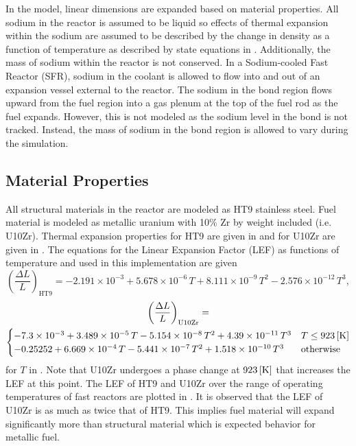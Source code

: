   In the model, linear dimensions are expanded based on material properties.
  All sodium in the reactor is assumed to be liquid so effects of thermal
  expansion within the sodium are assumed to be described by the change in
  density as a function of temperature as described by state equations in
  \cite{sodiumProp}. Additionally, the mass of sodium within the reactor is not
  conserved. In a Sodium-cooled Fast Reactor (SFR), sodium in the coolant is 
  allowed to flow into and out of an expansion vessel external to the reactor.
  The sodium in the bond region flows upward from the fuel region into a gas 
  plenum at the top of the fuel rod as the fuel expands. However, this is not 
  modeled as the sodium level in the bond is not tracked. Instead, the mass of 
  sodium in the bond region is allowed to vary during the simulation.

  \subsection{Material Properties}
    \label{sec:model_details__material_properties}
    All structural materials in the reactor are modeled as HT9 stainless steel.
    Fuel material is modeled as metallic uranium with 10\% Zr by weight included
    (i.e. U10Zr). Thermal expansion properties for HT9 are given in 
    \cite{ht9Prop} and for U10Zr are given in \cite{thexpU10Zr}. The equations 
    for the Linear Expansion Factor (LEF) as functions of temperature and used 
    in this implementation are given
    \begin{equation}
      \label{eq:lef_ht9}
      \left( \frac{\Delta L}{L} \right)_{\text{HT9}} = 
        -2.191 \times 10^{-3} + 5.678 \times 10^{-6} \, T + 
        8.111 \times 10^{-9} \, T^2 - 2.576 \times 10^{-12} \, T^3 ,
    \end{equation}
    \begin{multline}
      \label{eq:lef_u10zr}
      \left( \frac{\Delta L}{L} \right)_{\text{U10Zr}} = \\
        \begin{cases}
          -7.3 \times 10^{-3} + 3.489 \times 10^{-5} \, T 
            - 5.154 \times 10^{-8} \, T^2 + 4.39 \times 10^{-11} \, T^3 & 
            T \le 923 \left[\text{{K}}\right] \\
          -0.25252 + 6.669 \times 10^{-4} \, T - 5.441 \times 10^{-7} \, T^2 
            + 1.518 \times 10^{-10} \, T^3 & \text{otherwise}
        \end{cases}
    \end{multline}
    for $T$ in . Note that U10Zr undergoes a phase change at 
    $923 \left[\text{{K}}\right]$ that increases the LEF at this point. The LEF of HT9 and 
    U10Zr over the range of operating temperatures of fast reactors are plotted 
    in . It is observed that the LEF of U10Zr is as much as 
    twice that of HT9. This implies fuel material will expand significantly more 
    than structural material which is expected behavior for metallic fuel.

